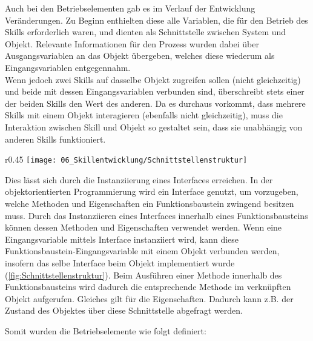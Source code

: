 	 Auch bei den Betriebselementen gab es im Verlauf der Entwicklung Veränderungen. Zu Beginn enthielten diese alle Variablen, die für den Betrieb des Skills erforderlich waren, und dienten als Schnittstelle zwischen System und Objekt. Relevante Informationen für den Prozess wurden dabei über Ausgangsvariablen an das Objekt übergeben, welches diese wiederum als Eingangsvariablen entgegennahm.
	 \\
	 Wenn jedoch zwei Skills auf dasselbe Objekt zugreifen sollen (nicht gleichzeitig) und beide mit dessen Eingangsvariablen verbunden sind, überschreibt stets einer der beiden Skills den Wert des anderen. Da es durchaus vorkommt, dass mehrere Skills mit einem Objekt interagieren (ebenfalls nicht gleichzeitig), muss die Interaktion zwischen Skill und Objekt so gestaltet sein, dass sie unabhängig von anderen Skills funktioniert.
	 \\
	 \begin{wrapfigure}{r}{0.45\textwidth}
	 	\centering
	 	\texttt{[image: 06\_Skillentwicklung/Schnittstellenstruktur]}
	 	\captionsetup{justification=centering}
	 	\caption{Schnittstellenstruktur}
	 	\label{fig:Schnittstellenstruktur}
	 \end{wrapfigure} Dies lässt sich durch die Instanziierung eines Interfaces erreichen. In der objektorientierten Programmierung wird ein Interface genutzt, um vorzugeben, welche Methoden und Eigenschaften ein Funktionsbaustein zwingend besitzen muss. Durch das Instanziieren eines Interfaces innerhalb eines Funktionsbausteins können dessen Methoden und Eigenschaften verwendet werden. Wenn eine Eingangsvariable mittels Interface instanziiert wird, kann diese Funktionsbaustein-Eingangsvariable mit einem Objekt verbunden werden, insofern das selbe Interface beim Objekt implementiert wurde (\ref{fig:Schnittstellenstruktur}). Beim Ausführen einer Methode innerhalb des Funktionsbausteins wird dadurch die entsprechende Methode im verknüpften Objekt aufgerufen. Gleiches gilt für die Eigenschaften. Dadurch kann z.B. der Zustand des Objektes über diese Schnittstelle abgefragt werden. 
	 
	 \newpage
	 
	 Somit wurden die Betriebselemente wie folgt definiert: 
	 
